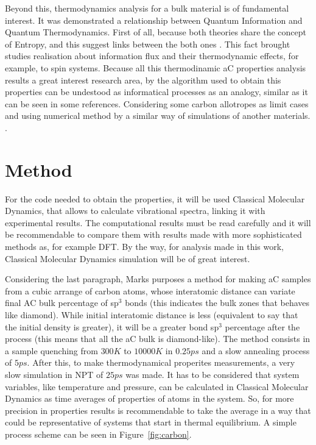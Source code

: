 \documentclass[a4paper,fleqn]{cas-dc}
\begin{document}
Beyond this, thermodynamics analysis for a bulk material is of fundamental interest. It was demonstrated a relationship between Quantum Information and Quantum Thermodynamics. First of all, because both theories share the concept of Entropy, and this suggest links between the both ones \cite{QTh}. This fact brought studies realisation about information flux and their thermodynamic effects, for example, to spin systems. \cite{ThermoQIFlow} Because all this thermodinamic aC properties analysis results a great interest research area, by the algorithm used to obtain this properties can be undestood as informatical processes as an analogy, similar as it can be seen in some references. Considering some carbon allotropes as limit cases and using numerical method by a similar way of simulations of another materials.  \cite{ThermoFlow}. 
\section{Method}
For the code needed to obtain the properties, it will be used  Classical Molecular Dynamics, that allows to calculate vibrational spectra, linking it with experimental results. The computational results must be read carefully and it will be recommendable to compare them with results made with more sophisticated methods as, for example DFT. By the way, for analysis made in this work, Classical Molecular Dynamics simulation will be of great interest. 

Considering the last paragraph, Marks\cite{ACPot1} purposes a method for making aC samples from a cubic arrange of carbon atoms, whose interatomic distance can variate final AC bulk percentage of sp$^3$ bonds (this indicates the bulk zones that behaves like diamond). While initial interatomic distance is less (equivalent to say that the initial density is greater), it will be a greater bond sp$^3$ percentage after the process (this means that all the aC bulk is diamond-like). The method consists in a sample quenching from $300K$ to $10000 K$ in $0.25 ps$ and a slow annealing process of $5ps$. After this, to make thermodynamical properites measurements, a very slow simulation in NPT of $25 ps$ was made. It has to be considered that system variables, like temperature and pressure, can be calculated in Classical Molecular Dynamics as time averages of  properties of atoms in the system. So, for more precision in properties results is recommendable to take the average in a way that could be representative of systems that start in thermal equilibrium. A simple process scheme can be seen in Figure~\ref{fig:carbon}.
\end{document}
